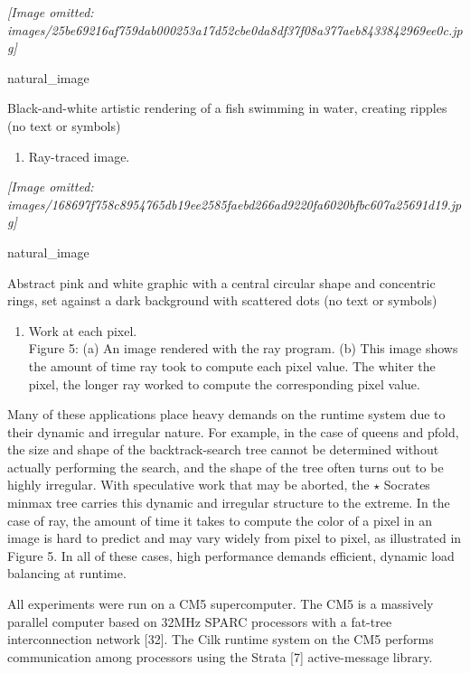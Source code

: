 \documentclass[
]{article}
\providecommand{\tightlist}{%
  \setlength{\itemsep}{0pt}\setlength{\parskip}{0pt}}
\begin{document}
\textit{[Image omitted: images/25be69216af759dab000253a17d52cbe0da8df37f08a377aeb8433842969ee0c.jpg]}

natural\_image

Black-and-white artistic rendering of a fish swimming in water, creating
ripples (no text or symbols)

\begin{enumerate}
\def\labelenumi{(\alph{enumi})}
\tightlist
\item
  Ray-traced image.
\end{enumerate}

\textit{[Image omitted: images/168697f758c8954765db19ee2585faebd266ad9220fa6020bfbc607a25691d19.jpg]}

natural\_image

Abstract pink and white graphic with a central circular shape and
concentric rings, set against a dark background with scattered dots (no
text or symbols)

\begin{enumerate}
\def\labelenumi{(\alph{enumi})}
\setcounter{enumi}{1}
\tightlist
\item
  Work at each pixel.\\
  Figure 5: (a) An image rendered with the ray program. (b) This image
  shows the amount of time ray took to compute each pixel value. The
  whiter the pixel, the longer ray worked to compute the corresponding
  pixel value.
\end{enumerate}

Many of these applications place heavy demands on the runtime system due
to their dynamic and irregular nature. For example, in the case of
queens and pfold, the size and shape of the backtrack-search tree cannot
be determined without actually performing the search, and the shape of
the tree often turns out to be highly irregular. With speculative work
that may be aborted, the \(\star\) Socrates minmax tree carries this
dynamic and irregular structure to the extreme. In the case of ray, the
amount of time it takes to compute the color of a pixel in an image is
hard to predict and may vary widely from pixel to pixel, as illustrated
in Figure 5. In all of these cases, high performance demands efficient,
dynamic load balancing at runtime.

All experiments were run on a CM5 supercomputer. The CM5 is a massively
parallel computer based on 32MHz SPARC processors with a fat-tree
interconnection network {[}32{]}. The Cilk runtime system on the CM5
performs communication among processors using the Strata {[}7{]}
active-message library.
\end{document}
